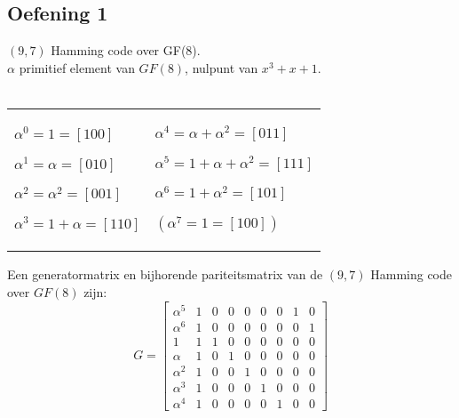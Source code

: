 \documentclass[11pt,a4paper,titlepage]{article}
\begin{document}
\subsection{Oefening 1}
	$(9,7)$ Hamming code over GF(8).\\
	$\alpha$ primitief element van $GF(8)$, nulpunt van $x^3 + x + 1$.\\ \\
	\begin{tabularx}{\textwidth}{XX}
$\alpha^0 = 1 = [100]$

$\alpha^1 = \alpha = [010]$

$\alpha^2 = \alpha^2 = [001]$

$\alpha^3 = 1 + \alpha = [110]$

&
$\alpha^4 = \alpha + \alpha^2 = [011]$

$\alpha^5 = 1 + \alpha + \alpha^2 = [111]$

$\alpha^6 = 1 + \alpha^2 = [101]$

$(\alpha^7 = 1 = [100])$
\end{tabularx}
Een generatormatrix en bijhorende pariteitsmatrix van de $(9,7)$ Hamming code over $GF(8)$ zijn:\\
\[
G =
\begin{bmatrix}
	\alpha^5 & 1 & 0 & 0 & 0 & 0 & 0 & 1 & 0 \\
	\alpha^6 & 1 & 0 & 0 & 0 & 0 & 0 & 0 & 1 \\
	1		 & 1 & 1 & 0 & 0 & 0 & 0 & 0 & 0 \\
	\alpha	 & 1 & 0 & 1 & 0 & 0 & 0 & 0 & 0 \\
	\alpha^2 & 1 & 0 & 0 & 1 & 0 & 0 & 0 & 0 \\
	\alpha^3 & 1 & 0 & 0 & 0 & 1 & 0 & 0 & 0 \\
	\alpha^4 & 1 & 0 & 0 & 0 & 0 & 1 & 0 & 0
\end{bmatrix}
\]
\end{document}
